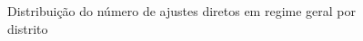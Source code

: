 \begin{figure}[H]
\begin{minipage}[t]{.55\textwidth}
		\caption{Distribuição do número de ajustes diretos em regime geral por distrito}
	\end{minipage}
\end{figure}
























































